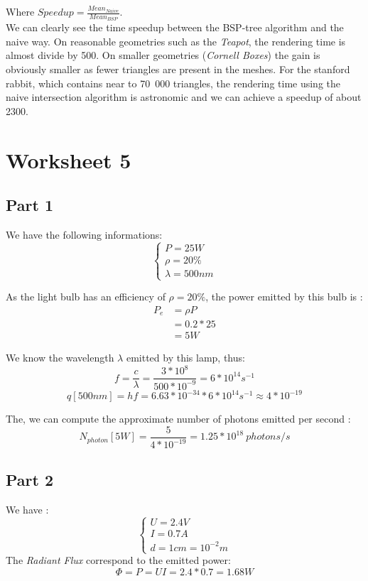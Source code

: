 \documentclass[a4,12pt]{article}
\begin{document}
	Where $Speedup = \frac{Mean_{Naive}}{Mean_{BSP}}$.\\
	
	
	We can clearly see the time speedup between the BSP-tree algorithm and the naive way. On reasonable geometries such as the \textit{Teapot}, the rendering time is almost divide by 500. On smaller geometries (\textit{Cornell Boxes}) the gain is obviously smaller as fewer triangles are present in the meshes. For the stanford rabbit, which contains near to 70\ 000 triangles, the rendering time using the naive intersection algorithm is astronomic and we can achieve a speedup of about 2300.
	

	\section{Worksheet 5}
	
	\subsection{Part 1}
	We have the following informations:
	$$
	\begin{cases}
		P = 25W\\
		\rho = 20\%\\
		\lambda = 500nm
	\end{cases}
	$$
	
	As the light bulb has an efficiency of $\rho = 20\%$, the power emitted by this bulb is :
	\begin{align*}
	P_e &= \rho P\\
	&= 0.2*25\\
	&= 5W
	\end{align*}
	
	We know the wavelength $\lambda$ emitted by this lamp, thus:
	$$
	f = \frac{c}{\lambda} = \frac{3*10^{8}}{500*10^{-9}} = 6*10^{14} s^{-1}$$
	$$
	q[500nm] = hf = 6.63*10^{-34} * 6*10^{14} s^{-1} \approx 4*10^{-19}
	$$
	
	The, we can compute the approximate number of photons emitted per second :
	$$
	N_{photon}[5W] = \frac{5}{4*10^{-19}} = \boxed{1.25*10^{18}\ photons/s}
	$$
	
	\subsection{Part 2}
	We have :
	$$
	\begin{cases}
		U = 2.4V\\
		I = 0.7A\\
		d = 1cm = 10^{-2}m
	\end{cases}
	$$
	The \textit{Radiant Flux} correspond to the emitted power:
	$$
	\Phi = P = UI = 2.4*0.7 = \boxed{1.68W}
	$$
	
\end{document}
